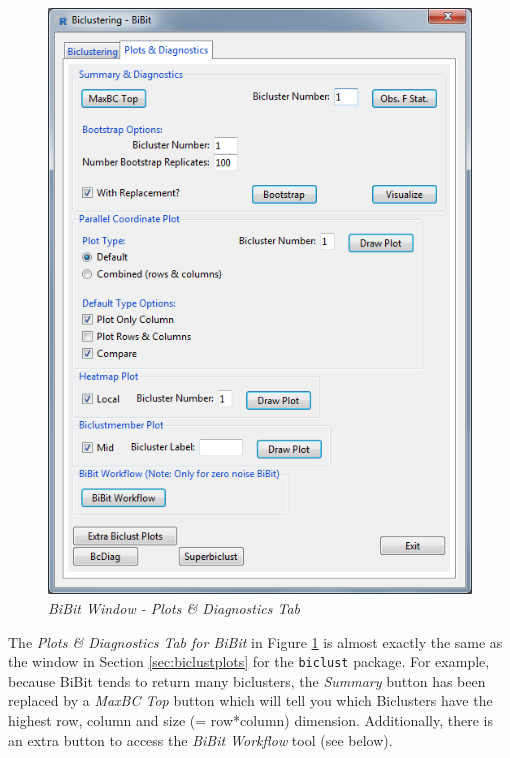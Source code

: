 \documentclass[a4paper]{article}\usepackage[]{graphicx}\usepackage[]{color}
\begin{document}
\begin{figure}[H]
\centering
\includegraphics[scale=0.5]{figures/bibit_plotdiagtab.png}
\caption{{\it BiBit Window - Plots \& Diagnostics Tab}\label{bibit_plotdiagtab}}
\end{figure} 

\noindent The {\it Plots \& Diagnostics Tab for BiBit} in Figure
\ref{bibit_plotdiagtab} is almost exactly the same as the window in Section \ref{sec:biclustplots} for the \texttt{biclust} package. For example, because BiBit tends to return many biclusters, the {\it Summary} button has been replaced by a {\it MaxBC Top} button which will tell you which Biclusters have the highest row, column and size (= row*column) dimension. Additionally, there is an extra button to access the {\it BiBit Workflow} tool (see below).
\\ \\
\end{document}
